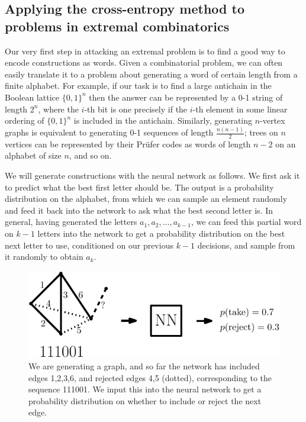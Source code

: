 \documentclass[11pt,english]{article}
\theoremstyle{plain}
\theoremstyle{remark}
\begin{document}
\subsection{Applying the cross-entropy method to problems in extremal combinatorics}\label{subsec:crossentropy}



Our very first step in attacking an extremal problem is to find a good way to encode constructions as words. Given a combinatorial problem, we can often easily translate it to a problem about generating a word of certain length from a finite alphabet. For example, if our task is to find a large antichain in the Boolean lattice $\{0,1\}^n$ then the answer can be represented by a 0-1 string of length $2^n$, where the $i$-th bit is one precisely if the $i$-th element in some linear ordering of $\{0,1\}^n$ is included in the antichain. Similarly, generating $n$-vertex graphs is equivalent to generating 0-1 sequences of length $\frac{n(n-1)}{2}$; trees on $n$ vertices can be represented by their Pr\"ufer codes as words of length $n-2$ on an alphabet of size $n$, and so on. 


We will generate constructions with the neural network as follows. We first ask it to predict what the best first letter should be. The output is a probability distribution on the alphabet, from which we can sample an element randomly and feed it back into the network to ask what the best second letter is. In general, having generated the letters $a_1,a_2,\ldots,a_{k-1}$, we can feed this partial word on $k-1$ letters into the network to get a probability distribution on the best next letter to use, conditioned on our previous $k-1$ decisions, and sample from it randomly to obtain $a_k$.


\begin{figure}[hbt]
    \centering
    \includegraphics[scale=.8]{nn.pdf}
    \caption{We are generating a graph, and so far the network has included edges 1,2,3,6, and rejected edges 4,5 (dotted), corresponding to the sequence 111001. We input this into the neural network to get a probability distribution on whether to include or reject the next edge.}
    \label{fig:nn_illustration}
\end{figure}
\end{document}

